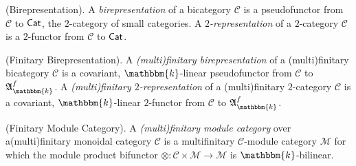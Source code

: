 \noindent\begin{definition}\textup{(Birepresentation).} A {\em birepresentation} of a bicategory $\mathscr{C}$ is a pseudofunctor from $\mathscr{C}$ to $\textnormal{\textsf{Cat}}$, the $2$-category of small categories. A {\em $2$-representation} of a $2$-category $\mathscr{C}$ is a $2$-functor from $\mathscr{C}$ to $\textnormal{\textsf{Cat}}$.\\
\end{definition}

\noindent\begin{definition}\textup{(Finitary Birepresentation).} A {\em (multi)finitary birepresentation} of a (multi)finitary bicategory $\mathscr{C}$ is a covariant, $\mathbbm{k}$-linear pseudofunctor from $\mathscr{C}$ to $\mathfrak{A}_\mathbbm{k}^f$. A {\em (multi)finitary $2$-representation} of a (multi)finitary $2$-category $\mathscr{C}$ is a covariant, $\mathbbm{k}$-linear $2$-functor from $\mathscr{C}$ to $\mathfrak{A}_\mathbbm{k}^f$.\\
\end{definition}

\noindent\begin{definition}\textup{(Finitary Module Category).} A {\em (multi)finitary module category} over a\linebreak (multi)finitary monoidal category $\mathcal{C}$ is a multifinitary $\mathcal{C}$-module category $\mathcal{M}$ for which the module product bifunctor $\otimes : \mathcal{C} \times \mathcal{M} \to \mathcal{M}$ is $\mathbbm{k}$-bilinear.\newpage
\end{definition}



